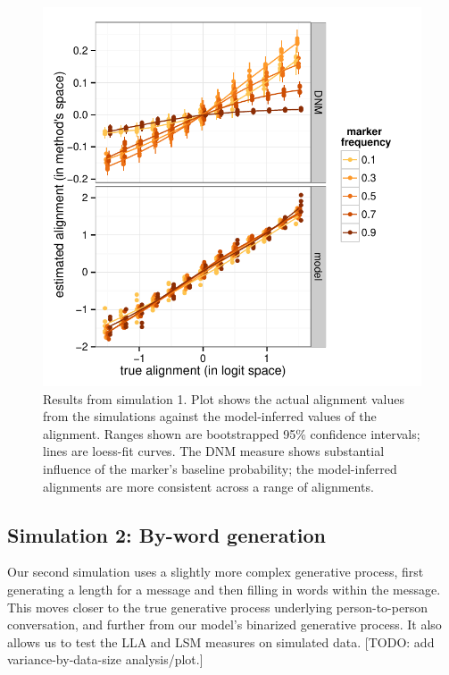 \documentclass{acm_proc_article-sp}
\begin{document}
\begin{figure}[t]
\centering
\includegraphics[width=\columnwidth]{graphics/www2016_simulation1_crossiter.pdf}
\caption{Results from simulation 1. Plot shows the actual alignment values from the simulations against the model-inferred values of the alignment. Ranges shown are bootstrapped 95\% confidence intervals; lines are loess-fit curves. The DNM measure shows substantial influence of the marker's baseline probability; the model-inferred alignments are more consistent across a range of alignments.}\label{fig:sim1}
\end{figure}

\subsection{Simulation 2: By-word generation}
Our second simulation uses a slightly more complex generative process, first generating a length for a message and then filling in words within the message.  This moves closer to the true generative process underlying person-to-person conversation, and further from our model's binarized generative process.  It also allows us to test the LLA and LSM measures on simulated data. [TODO: add variance-by-data-size analysis/plot.]
\end{document}

